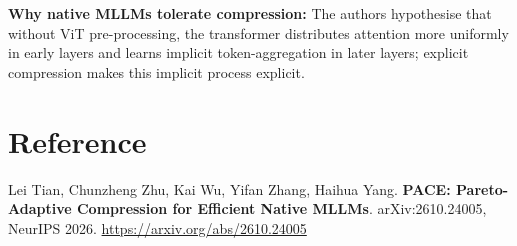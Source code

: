 \documentclass[10pt,twocolumn]{article}
\begin{document}
\textbf{Why native MLLMs tolerate compression:} The authors hypothesise that
without ViT pre-processing, the transformer distributes attention more
uniformly in early layers and learns implicit token-aggregation in later
layers; explicit compression makes this implicit process explicit.

\section*{Reference}

Lei Tian, Chunzheng Zhu, Kai Wu, Yifan Zhang, Haihua Yang.
\textbf{PACE: Pareto-Adaptive Compression for Efficient Native MLLMs}.
arXiv:2610.24005, NeurIPS 2026.
\url{https://arxiv.org/abs/2610.24005}
\end{document}
